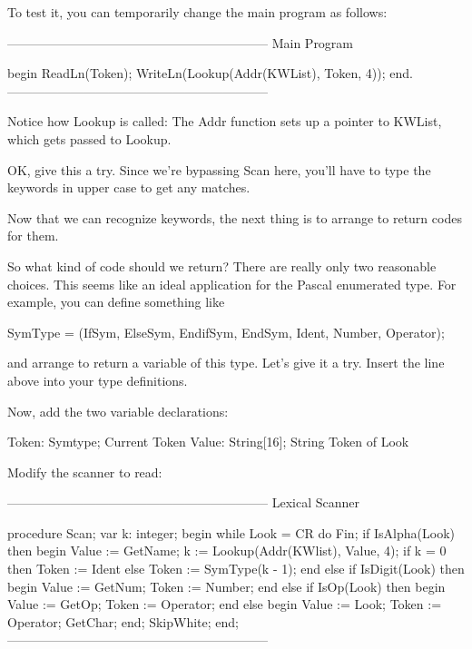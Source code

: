 \documentclass[float=false, crop=false]{standalone}
\begin{document}
To test it, you can temporarily change the main program as follows:

\begin{code}
{--------------------------------------------------------------}
{ Main Program }


begin
   ReadLn(Token);
   WriteLn(Lookup(Addr(KWList), Token, 4));
end.
{--------------------------------------------------------------}
\end{code}

Notice how Lookup is called: The Addr function sets up a pointer to KWList,
which gets passed to Lookup.

OK, give this a try. Since we're bypassing Scan here, you'll have to type the
keywords in upper case to get any matches.

Now that we can recognize keywords, the next thing is to arrange to return codes
for them.

So what kind of code should we return? There are really only two reasonable
choices. This seems like an ideal application for the Pascal enumerated type.
For example, you can define something like

     SymType = (IfSym, ElseSym, EndifSym, EndSym, Ident, Number,
                    Operator);

and arrange to return a variable of this type. Let's give it a try. Insert the
line above into your type definitions.

Now, add the two variable declarations:


    Token: Symtype;          { Current Token  }
    Value: String[16];       { String Token of Look }


Modify the scanner to read:

\begin{code}
{--------------------------------------------------------------}
{ Lexical Scanner }

procedure Scan;
var k: integer;
begin
   while Look = CR do
      Fin;
   if IsAlpha(Look) then begin
      Value := GetName;
      k := Lookup(Addr(KWlist), Value, 4);
      if k = 0 then
         Token := Ident
      else
         Token := SymType(k - 1);
      end
   else if IsDigit(Look) then begin
      Value := GetNum;
      Token := Number;
      end
   else if IsOp(Look) then begin
      Value := GetOp;
      Token := Operator;
      end
   else begin
      Value := Look;
      Token := Operator;
      GetChar;
   end;
   SkipWhite;
end;
{--------------------------------------------------------------}
\end{code}
\end{document}
